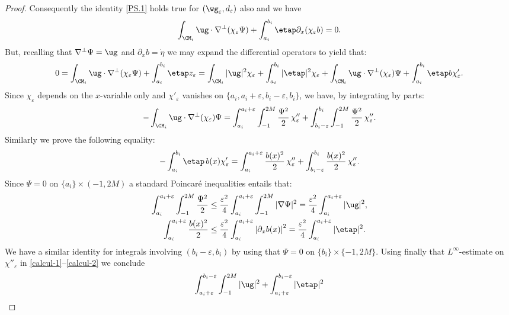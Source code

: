 \begin{proof}
Consequently the identity \eqref{PS.1} holds true for $(\wg_{\varepsilon},d_{\varepsilon})$ also and we have
\[
\int_{\CM_{i}}\ug\cdot\nabla^{\perp}(\chi_{\varepsilon}\Psi) + \int_{a_{i}}^{b_{i}}\etap \partial_x (\chi_{\varepsilon} b)=0.
\]
But, recalling that $\nabla^{\bot} \Psi = \ug$ and $\partial_x b = \dot{\eta}$ we may expand the differential operators to yield that:
\[
0 = \int_{\CM_{i}}\ug\cdot\nabla^{\perp}(\chi_{\varepsilon}\Psi) + \int_{a_{i}}^{b_{i}}\etap z_\varepsilon=\int_{\CM_{i}}\vert\ug\vert^{2}\chi_\varepsilon + \int_{a_{i}}^{b_{i}}\vert\etap\vert^{2}\chi_\varepsilon + \int_{\CM_{i}}\ug\cdot\nabla^{\perp}(\chi_{\varepsilon})\Psi + \int_{a_{i}}^{b_{i}}\etap b{\chi}_{\varepsilon}'.
\]
Since $\chi_{\varepsilon}$ depends on the $x$-variable only and $\chi'_{\varepsilon}$ vanishes on $\{a_i,a_i+ \varepsilon,b_i-\varepsilon,b_i\}$, we have, by integrating by parts:
\begin{equation}\label{calcul-1}
-\int_{\CM_{i}}\ug\cdot\nabla^{\perp}(\chi_{\varepsilon})\Psi=\int_{a_i}^{a_i+\varepsilon} \int_{-1}^{2M} \frac{\Psi^{2}}{2}\,{\chi}_{\varepsilon}''
+ \int_{b_i-\varepsilon}^{b_i} \int_{-1}^{2M} \frac{\Psi^{2}}{2}\,{\chi}_{\varepsilon}''.
\end{equation}
Similarly we prove the following equality:
\begin{equation}\label{calcul-2}-\int_{a_{i}}^{b_{i}}\etap\,b(x) {\chi}_{\varepsilon}'=
\int_{a_i}^{a_i+\varepsilon}\frac{b(x)^{2}}{2}\,{{\chi}_{\varepsilon}''}
+\int_{b_i-\varepsilon}^{b_i}\frac{b(x)^{2}}{2}\,{{\chi}_{\varepsilon}''}.
\end{equation}
Since $\Psi=0$ on $\{a_{i}\}\times(-1,2M)$
a standard Poincaré inequalities entails that:
\[\begin{aligned}
\int_{a_{i}}^{a_i+\varepsilon} \int_{-1}^{2M} \frac{\Psi^{2}}{2}&\leq \frac{\varepsilon^{2}}{4}\int_{a_{i}}^{a_i+\varepsilon} \int_{-1}^{2M}\vert\nabla\Psi\vert^{2}=\frac{\varepsilon^{2}}{4}\int_{a_{i}}^{a_i+\varepsilon}\vert\ug\vert^{2},\\
\int_{a_{i}}^{a_i+\varepsilon}\frac{b(x)^{2}}{2}&\leq\frac{\varepsilon^{2}}{4}\int_{a_{i}}^{a_i+\varepsilon}\left|\partial_{x}b(x)\right|^{2}=\frac{\varepsilon^{2}}{4}\int_{a_{i}}^{a_i+\varepsilon}\vert\etap\vert^{2}.
\end{aligned}
\]
We have a similar identity for integrals involving $(b_i-\varepsilon,b_i)$ by using that $\Psi = 0$ on $\{b_i\} \times \{-1,2M\}$. Using finally that $L^{\infty}$-estimate on ${\chi}''_{\varepsilon}$ in \eqref{calcul-1}--\eqref{calcul-2} we conclude
\begin{multline}\label{calcul-3}\int_{a_i+\varepsilon}^{b_i-\varepsilon} \int_{-1}^{2M} \vert\ug\vert^{2}+\int_{a_{i}+\varepsilon}^{b_{i}-\varepsilon}\vert\etap\vert^{2} \\

\end{multline}
\end{proof}
